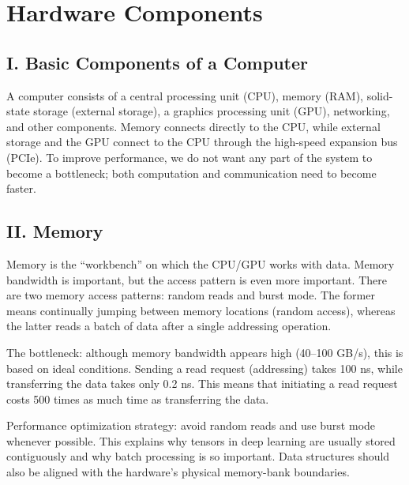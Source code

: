 \setcounter{section}{0}

\hypertarget{hardware-components}{%
\section{Hardware Components}\label{hardware-components}}

\hypertarget{i.-basic-components-of-a-computer}{%
\subsection{I. Basic Components of a Computer}\label{i.-basic-components-of-a-computer}}

A computer consists of a central processing unit (CPU), memory (RAM), solid-state storage (external storage), a graphics processing unit (GPU), networking, and other components. Memory connects directly to the CPU, while external storage and the GPU connect to the CPU through the high-speed expansion bus (PCIe). To improve performance, we do not want any part of the system to become a bottleneck; both computation and communication need to become faster.

\hypertarget{ii.-memory}{%
\subsection{II. Memory}\label{ii.-memory}}

Memory is the ``workbench'' on which the CPU/GPU works with data. Memory bandwidth is important, but the access pattern is even more important. There are two memory access patterns: random reads and burst mode. The former means continually jumping between memory locations (random access), whereas the latter reads a batch of data after a single addressing operation.

The bottleneck: although memory bandwidth appears high (40--100 GB/s), this is based on ideal conditions. Sending a read request (addressing) takes 100 ns, while transferring the data takes only 0.2 ns. This means that initiating a read request costs 500 times as much time as transferring the data.

Performance optimization strategy: avoid random reads and use burst mode whenever possible. This explains why tensors in deep learning are usually stored contiguously and why batch processing is so important. Data structures should also be aligned with the hardware's physical memory-bank boundaries.

